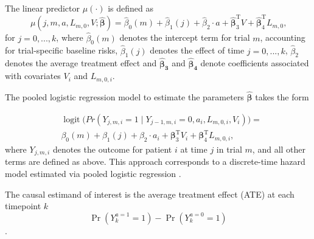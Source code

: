\documentclass[pdflatex,sn-vancouver-ay]{sn-jnl}%
\theoremstyle{thmstyleone}%
\theoremstyle{thmstyletwo}%
\theoremstyle{thmstylethree}%
\begin{document}
The linear predictor $\mu(\cdot)$ is defined as 
\begin{equation}
    \mu\left(j, m, a, L_{m, 0}, V ; \hat{\boldsymbol{\beta}}\right)=\hat{\beta}_0(m)+\hat{\beta}_1(j)+\hat{\beta}_2 \cdot a+\hat{\boldsymbol{\beta}}_3^{\mathrm{T}} V+\hat{\boldsymbol{\beta}}_4^{\mathrm{T}} L_{m, 0} \text{,}
\end{equation}
for $j = 0, ..., k$, where $\hat{\beta}_0(m)$ denotes the intercept term for trial $m$, accounting for trial-specific baseline risks, $\hat{\beta}_1(j)$ denotes the effect of time $j = 0, ..., k$, $\hat{\beta}_2$ denotes the average treatment effect and $\boldsymbol{\hat{\beta}_3}$ and $\boldsymbol{\hat{\beta}_4}$ denote coefficients associated with covariates $V_i$ and $L_{m,0,i}$. 

The pooled logistic regression model to estimate the parameters $\boldsymbol{\hat{\beta}}$ takes the form

\begin{equation}
\begin{split}
    \label{eq:logit}
&\operatorname{logit} \Big( Pr(Y_{j,m,i} = 1 \mid Y_{j-1,m,i} = 0, a_i, L_{m,0,i}, V_i) \Big) = \\
 &\beta_0(m) + \beta_1(j) + \beta_2 \cdot a_i 
+ \boldsymbol{\beta}_3^{\mathrm{T}} V_i + \boldsymbol{\beta}_4^{\mathrm{T}} L_{m,0,i} \text{,}
\end{split}
\end{equation}
where $Y_{j,m,i}$ denotes the outcome for patient $i$ at time $j$ in trial $m$, and all other terms are defined as above. This approach corresponds to a discrete-time hazard model estimated via pooled logistic regression \citep{zivichEstimatingEquationsSurvival2025}.

The causal estimand of interest is the average treatment effect (ATE) at each timepoint $k$
\begin{equation}
    \label{eq:ate}
    \operatorname{Pr}\left(Y_k^{a=1}=1\right)-\operatorname{Pr}\left(Y_k^{a=0}=1\right)
\end{equation}
\citep{schaferAverageCausalEffects2008}.
\end{document}
